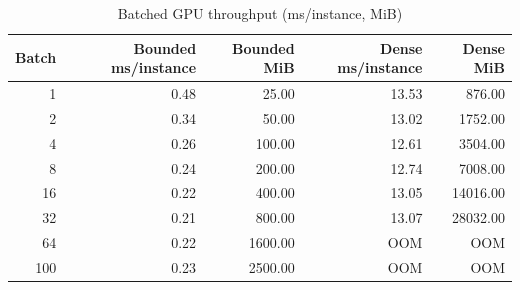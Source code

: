 \begin{table}[htbp]
\centering
\caption{Batched GPU throughput (ms/instance, MiB)}
\begin{tabular}{rrrrr}
\toprule
Batch & Bounded ms/instance & Bounded MiB & Dense ms/instance & Dense MiB \\
\midrule
1 & 0.48 & 25.00 & 13.53 & 876.00 \\
2 & 0.34 & 50.00 & 13.02 & 1752.00 \\
4 & 0.26 & 100.00 & 12.61 & 3504.00 \\
8 & 0.24 & 200.00 & 12.74 & 7008.00 \\
16 & 0.22 & 400.00 & 13.05 & 14016.00 \\
32 & 0.21 & 800.00 & 13.07 & 28032.00 \\
64 & 0.22 & 1600.00 & OOM & OOM \\
100 & 0.23 & 2500.00 & OOM & OOM \\
\bottomrule
\end{tabular}
\end{table}
